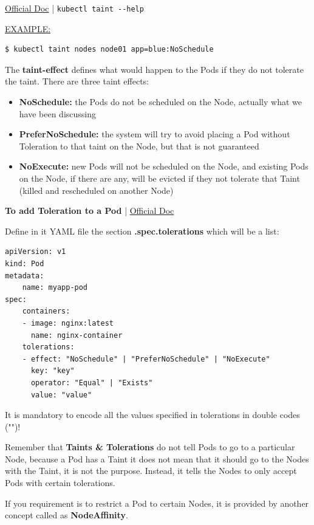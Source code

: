 \documentclass{article}
\newenvironment{blocktemplateII}[1]{%
    \tcolorbox[beamer,%
    noparskip,breakable,
    colframe=Green,%
    colbacklower=LimeGreen!75!LightGreen,%
    title=#1]}%
    {\endtcolorbox}
\newenvironment{blocktemplateIII}[1]{%
    \tcolorbox[beamer,%
    noparskip,breakable,
    ,colframe=Red,%
    colbacklower=LimeGreen!75!LightGreen,%
    title=#1]}%
    {\endtcolorbox}
\newenvironment{codetemplate}[1][]{%
  \mybasecolorbox[#1]
  \itshape
}{%
  \endmybasecolorbox
}
\begin{document}
\href{https://kubernetes.io/docs/concepts/scheduling-eviction/taint-and-toleration/}{Official Doc} | \verb|kubectl taint --help|

\underline{EXAMPLE:}
\begin{codetemplate}{}
\begin{verbatim}
$ kubectl taint nodes node01 app=blue:NoSchedule
\end{verbatim}
\end{codetemplate}

The \textbf{taint-effect} defines what would happen to the Pods if they do not tolerate the taint. There are three taint effects:

\begin{itemize}
    \item \textbf{NoSchedule:} the Pods do not be scheduled on the Node, actually what we have been discussing
    \item \textbf{PreferNoSchedule:} the system will try to avoid placing a Pod without Toleration to that taint on the Node, but that is not guaranteed
    \item \textbf{NoExecute:} new Pods will not be scheduled on the Node, and existing Pods on the Node, if there are any, will be evicted if they not tolerate that Taint (killed and rescheduled on another Node)
\end{itemize}

\textbf{To add Toleration to a Pod} | \href{https://kubernetes.io/docs/concepts/scheduling-eviction/taint-and-toleration/}{Official Doc}

Define in it YAML file the section \textbf{.spec.tolerations} which will be a list:

\label{NodeSelector}
\begin{codetemplate}{}
\begin{verbatim}
apiVersion: v1
kind: Pod
metadata:
    name: myapp-pod
spec:
    containers:
    - image: nginx:latest
      name: nginx-container
    tolerations:
    - effect: "NoSchedule" | "PreferNoSchedule" | "NoExecute"
      key: "key" 
      operator: "Equal" | "Exists"
      value: "value"
\end{verbatim}
\end{codetemplate}

\begin{blocktemplateIII}{WARNING}
It is mandatory to encode all the values specified in tolerations in double codes ("")!
\end{blocktemplateIII}

\begin{blocktemplateII}{NOTE 1}
Remember that \textbf{Taints \& Tolerations} do not tell Pods to go to a particular Node, because a Pod has a Taint it does not mean that it should go to the Nodes with the Taint, it is not the purpose. Instead, it tells the Nodes to only accept Pods with certain tolerations.

If you requirement is to restrict a Pod to certain Nodes, it is provided by another concept called as \textbf{NodeAffinity}.
\end{blocktemplateII}
\end{document}
